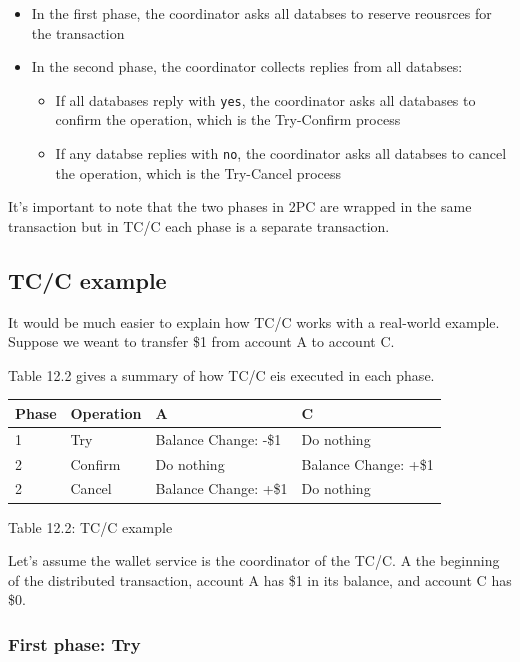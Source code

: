 \documentclass{report}
\theoremstyle{definition}
\let\oldsubsection\subsection
\let\oldsubsubsection\subsubsection
\renewcommand{\subsection}{\oldsubsection*}
\renewcommand{\subsubsection}{\oldsubsubsection*}
\begin{document}
\begin{itemize}
\item
In the first phase, the coordinator asks all databses to reserve reousrces for the transaction
\item
In the second phase, the coordinator collects replies from all databses:

\begin{itemize}
\item
If all databases reply with \lstinline|yes|, the coordinator asks all databases to confirm the operation, which is the Try-Confirm process
\item
If any databse replies with \lstinline|no|, the coordinator asks all databses to cancel the operation, which is the Try-Cancel process
\end{itemize}
\end{itemize}

It's important to note that the two phases in 2PC are wrapped in the same transaction but in TC/C each phase is a separate transaction.

\subsection{TC/C example}

It would be much easier to explain how TC/C works with a real-world example. Suppose we weant to transfer \$1 from account A to account C.

Table 12.2 gives a summary of how TC/C eis executed in each phase.

\begin{tabular}{|p{3.5cm}|p{3.5cm}|p{3.5cm}|p{3.5cm}|}
\hline
Phase & Operation & A & C \\
\hline
1 & Try & Balance Change: -\$1 & Do nothing \\
\hline
2 & Confirm & Do nothing & Balance Change: +\$1 \\
\hline
2 & Cancel & Balance Change: +\$1 & Do nothing \\
\hline
\end{tabular}

Table 12.2: TC/C example

Let's assume the wallet service is the coordinator of the TC/C. A the beginning of the distributed transaction, account A has \$1 in its balance, and account C has \$0.

\subsubsection{First phase: Try}
\end{document}
